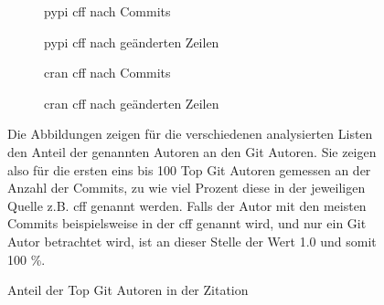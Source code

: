 \begin{figure}
    \begin{subfigure}{.5\textwidth}
        \centering
        
        \caption{\gls{pypi} \gls{cff} nach Commits}
        \label{fig:common_authors_pypi_cff}
    \end{subfigure}%
    \begin{subfigure}{.5\textwidth}
        \centering
        
        \caption{\gls{pypi} \gls{cff} nach geänderten Zeilen}
        \label{fig:common_authors_by_files_pypi_cff}
    \end{subfigure}
    \begin{subfigure}{.5\textwidth}
        \centering
        
        \caption{\gls{cran} \gls{cff} nach Commits}
        \label{fig:common_authors_cran_cff}
    \end{subfigure}%
    \begin{subfigure}{.5\textwidth}
        \centering
        
        \caption{\gls{cran} \gls{cff} nach geänderten Zeilen}
        \label{fig:common_authors_by_files_cran_cff}
    \end{subfigure}
    \caption{Anteil der Top Git Autoren in der Zitation}
    \label{fig:common_authors}
    \small
    \raggedright
    Die Abbildungen zeigen für die verschiedenen analysierten Listen den Anteil der genannten Autoren an den Git Autoren. Sie zeigen also für die ersten eins bis 100 Top Git Autoren gemessen an der Anzahl der Commits, zu wie viel Prozent diese in der jeweiligen Quelle z.B. \gls{cff} genannt werden. Falls der Autor mit den meisten Commits beispielsweise in der \gls{cff} genannt wird, und nur ein Git Autor betrachtet wird, ist an dieser Stelle der Wert 1.0 und somit 100 \%.
\end{figure}

